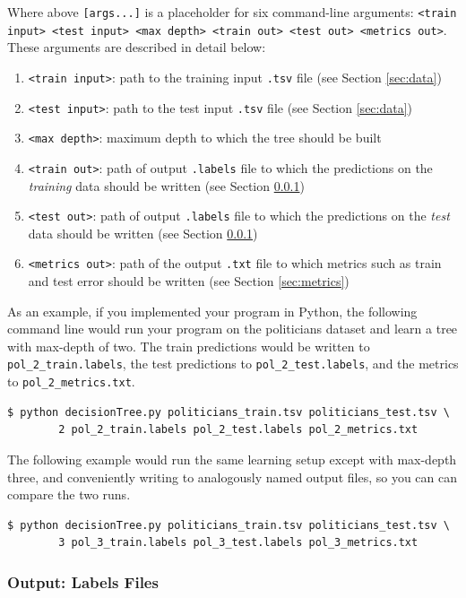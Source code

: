 \documentclass[11pt]{article}
\numberwithin{equation}{section} %
\numberwithin{figure}{section} %
\numberwithin{table}{section} %
\begin{document}
Where above \lstinline{[args...]} is a placeholder for six command-line arguments: 
\texttt{<train input> <test input> <max depth> <train out> <test out> <metrics out>}. These arguments are described in detail below:
\begin{enumerate}
\item \lstinline{<train input>}: path to the training input \lstinline{.tsv} file (see Section \ref{sec:data})
\item \lstinline{<test input>}: path to the test input \lstinline{.tsv} file (see Section \ref{sec:data})
\item \lstinline{<max depth>}: maximum depth to which the tree should be built
\item \lstinline{<train out>}: path of output \lstinline{.labels} file to which the predictions on the \textit{training} data should be written (see Section \ref{sec:labels})
\item \lstinline{<test out>}: path of output \lstinline{.labels} file to which the predictions on the \emph{test} data should be written (see Section \ref{sec:labels})
\item \lstinline{<metrics out>}: path of the output \lstinline{.txt} file to which metrics such as train and test error should be written (see Section \ref{sec:metrics})
\end{enumerate}

As an example, if you implemented your program in Python, the following command line would run your program on the politicians dataset and learn a tree with max-depth of two. The train predictions would be written to \lstinline{pol_2_train.labels}, the test predictions to \lstinline{pol_2_test.labels}, and the metrics to \lstinline{pol_2_metrics.txt}.
%
\begin{lstlisting}[language=Shell]
$ python decisionTree.py politicians_train.tsv politicians_test.tsv \ 
        2 pol_2_train.labels pol_2_test.labels pol_2_metrics.txt
\end{lstlisting}
%
The following example would run the same learning setup except with max-depth three, and conveniently writing to analogously named output files, so you can can compare the two runs.
%
\begin{lstlisting}[language=Shell]
$ python decisionTree.py politicians_train.tsv politicians_test.tsv \ 
        3 pol_3_train.labels pol_3_test.labels pol_3_metrics.txt
\end{lstlisting}

\subsubsection{Output: Labels Files}
\label{sec:labels}
\end{document}
